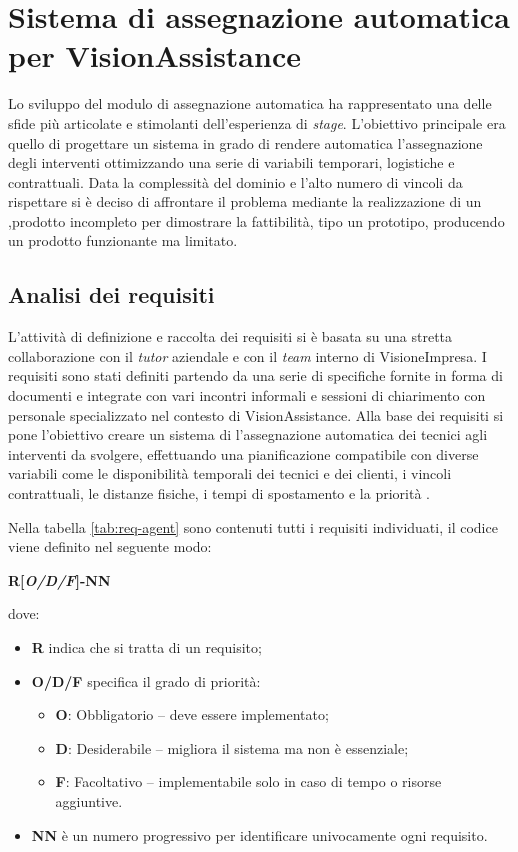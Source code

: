 \section{Sistema di assegnazione automatica per VisionAssistance}
Lo sviluppo del modulo di assegnazione automatica ha rappresentato una delle sfide più articolate e stimolanti dell'esperienza di \textit{stage}. L'obiettivo principale era quello di progettare un sistema in grado di rendere automatica l'assegnazione degli interventi ottimizzando una serie di variabili temporari, logistiche e contrattuali.
Data la complessità del dominio e l'alto numero di vincoli da rispettare si è deciso di affrontare il problema mediante la realizzazione di un ,prodotto incompleto per dimostrare la fattibilità, tipo un prototipo, producendo un prodotto funzionante ma limitato.

\subsection{Analisi dei requisiti}
L'attività di definizione e raccolta dei requisiti si è basata su una stretta collaborazione con il \textit{tutor} aziendale e con il \textit{team} interno di VisioneImpresa. I requisiti sono stati definiti partendo da una serie di specifiche fornite in forma di documenti e integrate con vari incontri informali e sessioni di chiarimento con personale specializzato nel contesto di VisionAssistance. 
Alla base dei requisiti si pone l'obiettivo creare un sistema di l'assegnazione automatica dei tecnici agli interventi da svolgere, effettuando una pianificazione compatibile con diverse variabili come le disponibilità temporali dei tecnici e dei clienti, i vincoli contrattuali, le distanze fisiche, i tempi di spostamento e la priorità .

Nella tabella \ref{tab:req-agent} sono contenuti tutti i requisiti individuati, il codice viene definito nel seguente modo: 
\begin{center}
\textbf{R[\textit{O/D/F}]-NN}
\end{center}

dove:
\begin{itemize}
  \item \textbf{R} indica che si tratta di un requisito;
  \item \textbf{O/D/F} specifica il grado di priorità:
    \begin{itemize}
      \item \textbf{O}: Obbligatorio – deve essere implementato;
      \item \textbf{D}: Desiderabile – migliora il sistema ma non è essenziale;
      \item \textbf{F}: Facoltativo – implementabile solo in caso di tempo o risorse aggiuntive.
    \end{itemize}
  \item \textbf{NN} è un numero progressivo per identificare univocamente ogni requisito.
\end{itemize}

